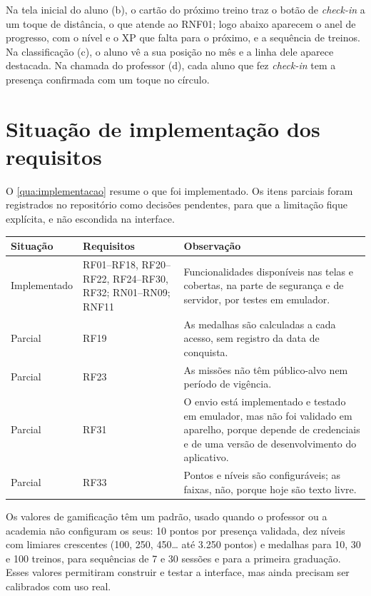 Na tela inicial do aluno (b), o cartão do próximo treino traz o botão de
\textit{check-in} a um toque de distância, o que atende ao RNF01; logo
abaixo aparecem o anel de progresso, com o nível e o XP que falta para o
próximo, e a sequência de treinos. Na classificação (c), o aluno vê a sua
posição no mês e a linha dele aparece destacada. Na chamada do professor
(d), cada aluno que fez \textit{check-in} tem a presença confirmada com um
toque no círculo.

\section{Situação de implementação dos requisitos}
\label{sec:situacao-implementacao}

O \autoref{qua:implementacao} resume o que foi implementado. Os itens
parciais foram registrados no repositório como decisões pendentes, para
que a limitação fique explícita, e não escondida na interface.

\begin{quadro}[!htb]
  \caption{Situação de implementação dos requisitos}
  \label{qua:implementacao}
  \centering
  \footnotesize
  \begin{tabular}{|p{2.2cm}|p{4.2cm}|p{7.0cm}|}
    \hline
    \textbf{Situação} & \textbf{Requisitos} & \textbf{Observação} \\ \hline
    Implementado & RF01--RF18, RF20--RF22, RF24--RF30, RF32; RN01--RN09; RNF11 & Funcionalidades disponíveis nas telas e cobertas, na parte de segurança e de servidor, por testes em emulador. \\ \hline
    Parcial & RF19 & As medalhas são calculadas a cada acesso, sem registro da data de conquista. \\ \hline
    Parcial & RF23 & As missões não têm público-alvo nem período de vigência. \\ \hline
    Parcial & RF31 & O envio está implementado e testado em emulador, mas não foi validado em aparelho, porque depende de credenciais e de uma versão de desenvolvimento do aplicativo. \\ \hline
    Parcial & RF33 & Pontos e níveis são configuráveis; as faixas, não, porque hoje são texto livre. \\ \hline
  \end{tabular}
\end{quadro}

Os valores de gamificação têm um padrão, usado quando o professor ou a
academia não configuram os seus: 10 pontos por presença validada, dez
níveis com limiares crescentes (100, 250, 450\ldots{} até 3.250 pontos) e
medalhas para 10, 30 e 100 treinos, para sequências de 7 e 30 sessões e
para a primeira graduação. Esses valores permitiram construir e testar a
interface, mas ainda precisam ser calibrados com uso real.

